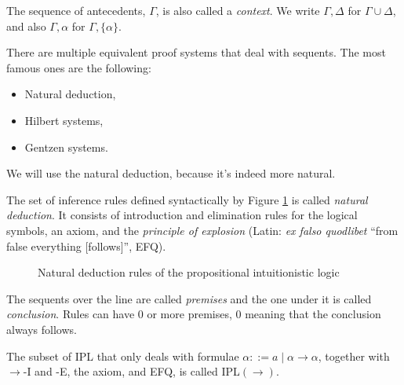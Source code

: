 The sequence of antecedents, $\Gamma$, is also called a \textit{context}. We write $\Gamma, \Delta$ for $\Gamma \cup \Delta$, and also $\Gamma, \alpha$ for $\Gamma, \{\alpha\}$.

There are multiple equivalent proof systems that deal with sequents. The most famous ones are the following:
\begin{itemize}
    \item Natural deduction,
    \item Hilbert systems,
    \item Gentzen systems.
\end{itemize}
We will use the natural deduction, because it's indeed more natural.

\begin{definition}
The set of inference rules defined syntactically by Figure \ref{fig:intuitionistic-logic-natural-deduction} is called \textit{natural deduction}. It consists of introduction and elimination rules for the logical symbols, an axiom, and the \textit{principle of explosion} (Latin: \textit{ex falso quodlibet} ``from false everything [follows]'', EFQ).
\end{definition}

\begin{figure}
    \centering
    
    \caption{Natural deduction rules of the propositional intuitionistic logic}
    \label{fig:intuitionistic-logic-natural-deduction}
\end{figure}

The sequents over the line are called \textit{premises} and the one under it is called \textit{conclusion}. Rules can have 0 or more premises, 0 meaning that the conclusion always follows.

The subset of IPL that only deals with formulae $\alpha ::= a \mid \alpha \rightarrow \alpha$, together with $\rightarrow$-I and -E, the axiom, and EFQ, is called IPL$(\rightarrow)$.